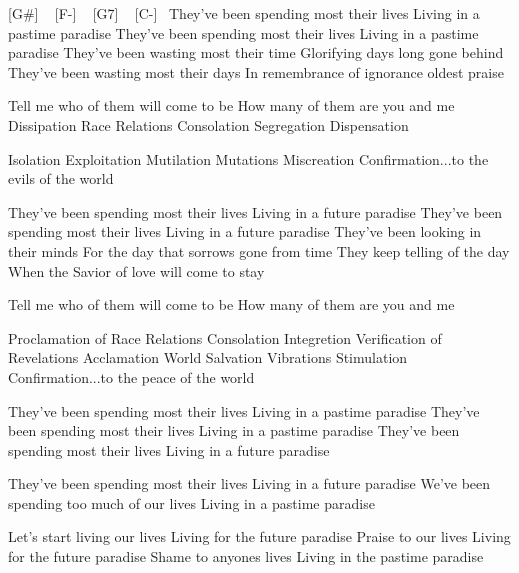 


[G\#] ~ [F-] ~ [G7] ~ [C-]~
They've been spending most their lives
Living in a pastime paradise
They've been spending most their lives
Living in a pastime paradise
They've been wasting most their time
Glorifying days long gone behind
They've been wasting most their days
In remembrance of ignorance oldest praise

Tell me who of them will come to be
How many of them are you and me
Dissipation
Race Relations
Consolation
Segregation
Dispensation

Isolation
Exploitation
Mutilation
Mutations
Miscreation
Confirmation...to the evils of the world

They've been spending most their lives
Living in a future paradise
They've been spending most their lives
Living in a future paradise
They've been looking in their minds
For the day that sorrows gone from time
They keep telling of the day
When the Savior of love will come to stay

Tell me who of them will come to be
How many of them are you and me

Proclamation
of Race Relations
Consolation
Integretion
Verification
of Revelations
Acclamation
World Salvation
Vibrations
Stimulation
Confirmation...to the peace of the world

They've been spending most their lives
Living in a pastime paradise
They've been spending most their lives
Living in a pastime paradise
They've been spending most their lives
Living in a future paradise

They've been spending most their lives
Living in a future paradise
We've been spending too much of our lives
Living in a pastime paradise

Let's start living our lives
Living for the future paradise
Praise to our lives
Living for the future paradise
Shame to anyones lives
Living in the pastime paradise